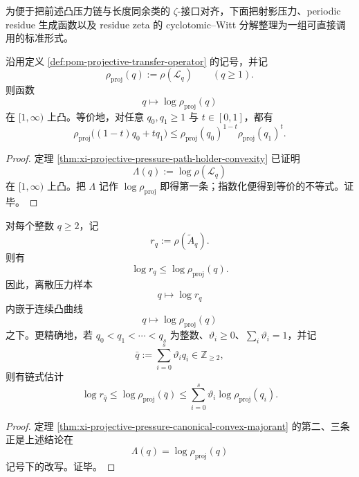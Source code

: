 为便于把前述凸压力链与长度同余类的 \(\zeta\)-接口对齐，下面把射影压力、periodic residue 生成函数以及 residue zeta 的 cyclotomic--Witt 分解整理为一组可直接调用的标准形式。

\begin{theorem}\label{thm:xi-time-part50dc-projective-pressure-perron-logconvex}
沿用定义 \ref{def:pom-projective-transfer-operator} 的记号，并记
\[
\rho_{\mathrm{proj}}(q):=\rho(\mathcal L_q)
\qquad (q\ge 1).
\]
则函数
\[
q\longmapsto \log \rho_{\mathrm{proj}}(q)
\]
在 \([1,\infty)\) 上凸。等价地，对任意 \(q_0,q_1\ge 1\) 与 \(t\in[0,1]\)，都有
\[
\rho_{\mathrm{proj}}\bigl((1-t)q_0+tq_1\bigr)
\le
\rho_{\mathrm{proj}}(q_0)^{1-t}\rho_{\mathrm{proj}}(q_1)^t.
\]
\end{theorem}
\begin{proof}
定理 \ref{thm:xi-projective-pressure-path-holder-convexity} 已证明
\[
\Lambda(q):=\log\rho(\mathcal L_q)
\]
在 \([1,\infty)\) 上凸。把 \(\Lambda\) 记作 \(\log\rho_{\mathrm{proj}}\) 即得第一条；指数化便得到等价的不等式。证毕。
\end{proof}

\begin{corollary}\label{cor:xi-time-part50dc-moment-kernel-convex-envelope}
对每个整数 \(q\ge 2\)，记
\[
r_q:=\rho(\widetilde A_q).
\]
则有
\[
\log r_q\le \log \rho_{\mathrm{proj}}(q).
\]
因此，离散压力样本
\[
q\longmapsto \log r_q
\]
内嵌于连续凸曲线
\[
q\longmapsto \log \rho_{\mathrm{proj}}(q)
\]
之下。更精确地，若 \(q_0<q_1<\cdots<q_s\) 为整数、\(\vartheta_i\ge 0\)、\(\sum_i\vartheta_i=1\)，并记
\[
\bar q:=\sum_{i=0}^s\vartheta_i q_i\in\mathbb Z_{\ge 2},
\]
则有链式估计
\[
\log r_{\bar q}
\le
\log \rho_{\mathrm{proj}}(\bar q)
\le
\sum_{i=0}^s \vartheta_i\log \rho_{\mathrm{proj}}(q_i).
\]
\end{corollary}
\begin{proof}
定理 \ref{thm:xi-projective-pressure-canonical-convex-majorant} 的第二、三条正是上述结论在
\[
\Lambda(q)=\log\rho_{\mathrm{proj}}(q)
\]
记号下的改写。证毕。
\end{proof}

